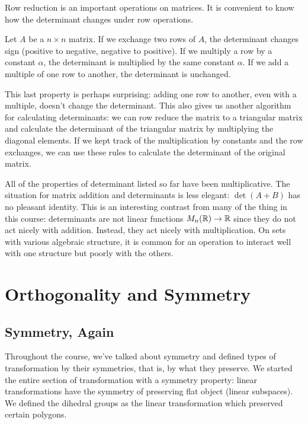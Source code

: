 \documentclass[fleqn]{report}
\begin{document}
Row reduction is an important operations on matrices. It is
convenient to know how the determinant changes under row
operations.

\begin{prop}
Let $A$ be a $n \times n$ matrix. If we exchange two rows of
$A$, the determinant changes sign (positive to negative,
negative to positive). If we multiply a row by a constant
$\alpha$, the determinant is multiplied by the same constant
$\alpha$. If we add a multiple of one row to another, the
determinant is unchanged.
\end{prop}

This last property is perhaps surprising: adding one row to
another, even with a multiple, doesn't change the determinant.
This also gives us another algorithm for calculating
determinants: we can row reduce the matrix to a triangular
matrix and calculate the determinant of the triangular matrix
by multiplying the diagonal elements. If we kept track of the
multiplication by constants and the row exchanges, we can use
these rules to calculate the determinant of the original
matrix.

All of the properties of determinant listed so far have been
multiplicative. The situation for matrix addition and
determinants is less elegant: $\det (A + B)$ has no pleasant
identity. This is an interesting contrast from many of the
thing in this course: determinants are not linear functions
$M_n(\mathbb{R}) \rightarrow \mathbb{R}$ since they do not act nicely with
addition. Instead, they act nicely with multiplication. On
sets with various algebraic structure, it is common for an
operation to interact well with one structure but poorly with
the others.

\chapter{Orthogonality and Symmetry}
\label{orthogonality}

\section{Symmetry, Again}

Throughout the course, we've talked about symmetry and defined
types of transformation by their symmetries, that is, by what they
preserve. We started the entire section of transformation with
a symmetry property: linear transformations have the symmetry of
preserving flat object (linear subspaces). We defined the
dihedral groups as the linear transformation which preserved certain
polygons.
\end{document}
